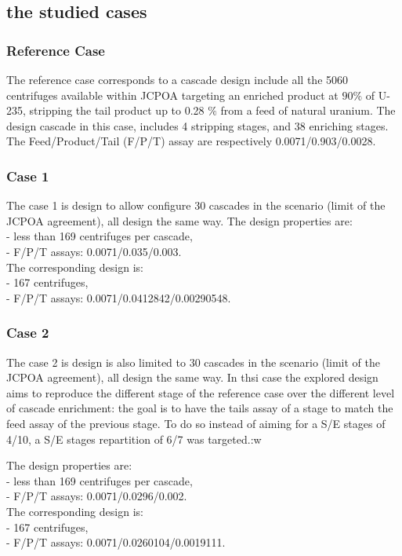 \documentclass{anstrans}
\begin{document}
\subsection{the studied cases}
\subsubsection{Reference Case}
The reference case corresponds to a cascade design include all the 5060
centrifuges available within JCPOA targeting an enriched product at $90\%$ of U-235,
stripping the tail product up to 0.28 $\%$ from a feed of natural uranium. 
The design cascade in this case, includes 4 stripping stages, and 38 enriching
stages. The Feed/Product/Tail (F/P/T) assay are respectively
0.0071/0.903/0.0028.

\subsubsection{Case 1}
The case 1 is design to allow configure 30 cascades in the scenario (limit of
the JCPOA agreement), all design the same way. The design properties are:\\
- less than 169 centrifuges per cascade,\\
- F/P/T assays: 0.0071/0.035/0.003.\\
The corresponding design is:\\
- 167 centrifuges,\\
- F/P/T assays: 0.0071/0.0412842/0.00290548.\\

\subsubsection{Case 2}
The case 2 is design is also limited to 30 cascades in the scenario (limit of
the JCPOA agreement), all design the same way. In thsi case the explored design
aims to reproduce the different stage of the reference case over the different
level of cascade enrichment: the goal is to have the tails assay of a stage to
match the feed assay of the previous stage. To do so instead of aiming for a
S/E stages of 4/10, a S/E stages repartition of 6/7 was targeted.:w


The design properties are:\\
- less than 169 centrifuges per cascade,\\
- F/P/T assays: 0.0071/0.0296/0.002.\\%
The corresponding design is:\\
- 167 centrifuges,\\
- F/P/T assays: 0.0071/0.0260104/0.0019111.\\
\end{document}
